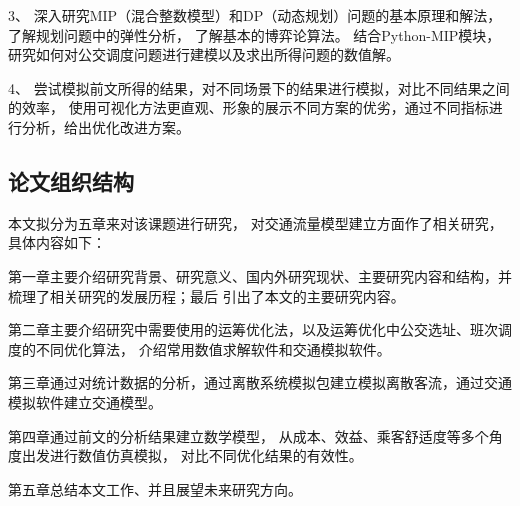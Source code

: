 3、 深入研究MIP（混合整数模型）和DP（动态规划）问题的基本原理和解法，了解规划问题中的弹性分析，
了解基本的博弈论算法。
结合Python-MIP模块，研究如何对公交调度问题进行建模以及求出所得问题的数值解。

4、 尝试模拟前文所得的结果，对不同场景下的结果进行模拟，对比不同结果之间的效率，
使用可视化方法更直观、形象的展示不同方案的优劣，通过不同指标进行分析，给出优化改进方案。
\subsection{论文组织结构}
本文拟分为五章来对该课题进行研究，
对交通流量模型建立方面作了相关研究，具体内容如下：

第一章主要介绍研究背景、研究意义、国内外研究现状、主要研究内容和结构，并梳理了相关研究的发展历程；最后
引出了本文的主要研究内容。

第二章主要介绍研究中需要使用的运筹优化法，以及运筹优化中公交选址、班次调度的不同优化算法，
介绍常用数值求解软件和交通模拟软件。

第三章通过对统计数据的分析，通过离散系统模拟包建立模拟离散客流，通过交通模拟软件建立交通模型。

第四章通过前文的分析结果建立数学模型，
从成本、效益、乘客舒适度等多个角度出发进行数值仿真模拟，
对比不同优化结果的有效性。

第五章总结本文工作、并且展望未来研究方向。
